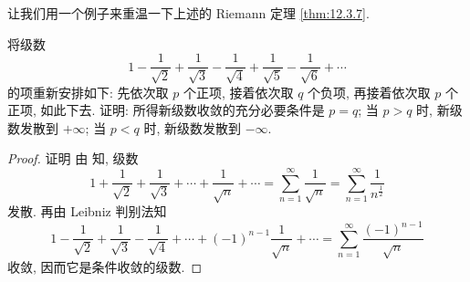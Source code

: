 让我们用一个例子来重温一下上述的 Riemann 定理 \ref{thm:12.3.7}.

\begin{example}\label{ex:12.3.7}
将级数
\[
  1-\frac{1}{\sqrt{2}}+\frac{1}{\sqrt{3}}-\frac{1}{\sqrt{4}}
  +\frac{1}{\sqrt{5}}-\frac{1}{\sqrt{6}}+\cdots
\]
的项重新安排如下: 先依次取 $p$ 个正项, 接着依次取 $q$ 个负项, 再接着依次取 $p$ 个正项, 如此下去. 证明: 所得新级数收敛的充分必要条件是 $p=q$; 当 $p>q$ 时, 新级数发散到 $+\infty$; 当 $p<q$ 时, 新级数发散到 $-\infty$.
\end{example}

\begin{proof}
证明 由 知, 级数
\[
  1+\frac{1}{\sqrt{2}}+\frac{1}{\sqrt{3}}+\cdots+\frac{1}{\sqrt{n}}+\cdots
  =\sum_{n=1}^{\infty}\frac{1}{\sqrt{n}}=\sum_{n=1}^{\infty}\frac{1}{n^{\frac{1}{2}}}
\]
发散. 再由 Leibniz 判别法知
\[
  1-\frac{1}{\sqrt{2}}+\frac{1}{\sqrt{3}}-\frac{1}{\sqrt{4}}+\cdots
  +(-1)^{n-1}\frac{1}{\sqrt{n}}+\cdots
  =\sum_{n=1}^{\infty}\frac{(-1)^{n-1}}{\sqrt{n}}
\]
收敛, 因而它是条件收敛的级数.


\end{proof}
